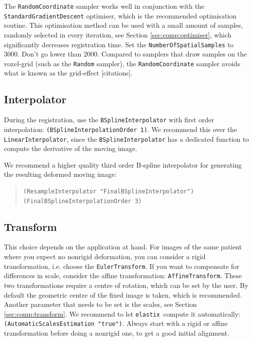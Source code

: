 \documentclass[]{report}
\newcommand{\elastix}{\texttt{elastix}}
\begin{document}
The \texttt{RandomCoordinate} sampler works well in conjunction with
the \texttt{StandardGradientDescent} optimiser, which is the
recommended optimisation routine. This optimisation method can be
used with a small amount of samples, randomly selected in every
iteration, see Section \ref{sec:comp:optimiser}, which significantly
decreases registration time. Set the \texttt{NumberOfSpatialSamples}
to 3000. Don't go lower than 2000. Compared to samplers that draw
samples on the voxel-grid (such as the \texttt{Random} sampler), the
\texttt{RandomCoordinate} sampler avoids what is known as the
grid-effect [citations].

\subsection{Interpolator}

During the registration, use the \texttt{BSplineInterpolator} with
first order interpolation: \texttt{(BSplineInterpolationOrder 1)}. We
recommend this over the \texttt{LinearInterpolator}, since the
\texttt{BSplineInterpolator} has a dedicated function to compute the
derivative of the moving image.

We recommend a higher quality third order B-spline interpolator for
generating the resulting deformed moving image:
\begin{quote}
\texttt{(ResampleInterpolator "FinalBSplineInterpolator")} \\
\texttt{(FinalBSplineInterpolationOrder 3)}
\end{quote}

\subsection{Transform}

This choice depends on the application at hand. For images of the
same patient where you expect no nonrigid deformation, you can
consider a rigid transformation, i.e. choose the
\texttt{EulerTransform}. If you want to compensate for differences in
scale, consider the affine transformation: \texttt{AffineTransform}.
These two transformations require a centre of rotation, which can be
set by the user. By default the geometric centre of the fixed image
is taken, which is recommended. Another parameter that needs to be
set is the scales, see Section \ref{sec:comp:transform}. We recommend
to let \elastix\ compute it automatically:
\texttt{(AutomaticScalesEstimation "true")}. Always start with a
rigid or affine transformation before doing a nonrigid one, to get a
good initial alignment.
\end{document}

